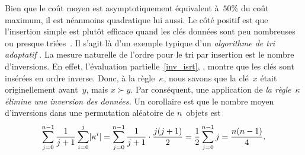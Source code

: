 Bien que le coût moyen est asymptotiquement équivalent à~\(50\%\) du
coût maximum, il est néanmoins quadratique lui aussi. Le côté positif
est que l'insertion simple est plutôt efficace quand les clés données
sont peu nombreuses ou presque triées~\citep{CookKim_1980}. Il s'agit
là d'un exemple typique d'un \emph{algorithme de tri adaptatif}
\citep{EstivillWood_1992,MoffatPetersson_1992}. La mesure naturelle de l'ordre pour le tri
par insertion est le nombre d'inversions. En effet, l'évaluation
partielle~\eqref{inv_isrt}, , montre que les clés
sont insérées en ordre inverse. Donc, à la règle~\(\kappa\), nous
savons que la clé~\(x\) était originellement avant~\(y\), mais \(x
\succ y\). Par conséquent, une application de \emph{la
  règle~\(\kappa\) élimine une inversion des données.} Un corollaire
est que le nombre moyen d'inversions dans une permutation aléatoire de
\(n\)~objets est
\begin{equation*}
\belowdisplayskip=-5pt
\sum_{j=0}^{n-1}\frac{1}{j+1}\sum_{i=0}^{j}\len{\kappa^i} =
\sum_{j=0}^{n-1}\frac{1}{j+1}\cdot\frac{j(j+1)}{2} =
\frac{1}{2}\sum_{j=0}^{n-1}j =
\frac{n(n-1)}{4}.
\end{equation*}

